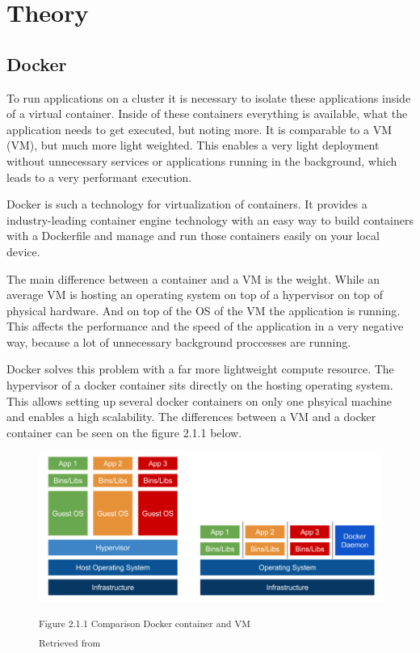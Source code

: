 \chapter{Theory}

\section{Docker} 

To run applications on a cluster it is necessary to isolate these applications inside of a virtual container. Inside of these containers everything is available, what the application needs to get executed, but noting more. It is comparable to a \acs{VM} (\acl{VM}), but much more light weighted. This enables a very light deployment without unnecessary services or applications running in the background, which leads to a very performant execution.


Docker is such a technology for virtualization of containers. It provides a industry-leading container engine technology with an easy way to build containers with a Dockerfile and manage and run those containers easily on your local device.


The main difference between a container and a VM is the weight. While an average VM is hosting an operating system on top of a hypervisor on top of physical hardware. And on top of the OS of the VM the application is running. This affects the performance and the speed of the application in a very negative way, because a lot of unnecessary background proccesses are running. 

Docker solves this problem with a far more lightweight compute resource. The hypervisor of a docker container sits directly on the hosting operating system. This allows setting up several docker containers on only one phsyical machine and enables a high scalability. The differences between a VM and a docker container can be seen on the figure 2.1.1 below.

\begin{figure}[h]
\centering
\includegraphics[width=\textwidth/5*4]{images/docker_vm_differences.png}

\textsuperscript{Figure 2.1.1 Comparison Docker container and VM}\\
\textsuperscript{Retrieved from \cite{}}
\end{figure}

